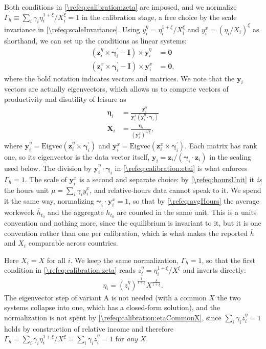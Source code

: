 Both conditions in \eqref{\refeq:calibration:zeta} are imposed, and we normalize $\Gamma_h \equiv \sum_i \gamma_i\eta_i^{1+\xi}/X_i^{\xi} = 1$ in the calibration stage, a free choice by the scale invariance in \eqref{\refeq:scaleInvariance}. Using $y_i^{\eta} = \eta_i^{1+\xi}/X_i^{\xi}$ and $y_i^x = (\eta_i/X_i)^{\xi}$ as shorthand, we can set up the conditions as linear systems:
\begin{align*}
    \left(\bm{z}_i^{\eta} \times \bm{\gamma}_i^{\prime}-\bm{I}\right)\times \bm{y}_i^{\eta} &= \bm{0} \\
    \left(\bm{z}_i^{x} \times \bm{\gamma}_i^{\prime}-\bm{I}\right)\times \bm{y}_i^{x} &= \bm{0},
\end{align*}
where the bold notation indicates vectors and matrices. We note that the $\bm{y}_i$ vectors are actually eigenvectors, which allows us to compute vectors of productivity and disutility of leisure as
\begin{align}
    \bm{\eta}_i &= \frac{\bm{y}^{\eta}_i}{\bm{y}_i^x \left(\bm{y}_i^{\eta} \cdot \bm{\gamma}_i\right)} \label{\refeq:calibration:etai} \\
    \bm{X}_i &= \frac{\bm{\eta}_i}{(\bm{y}_i^x)^{1/\xi}}, \label{\refeq:calibration:Xi}
\end{align}
where $\bm{y}_i^{\eta} = \text{Eigvec}(\bm{z}_i^{\eta}\times \bm{\gamma}_i^{\prime})$ and $\bm{y}_i^{x} = \text{Eigvec}(\bm{z}_i^{x}\times \bm{\gamma}_i^{\prime})$. Each matrix has rank one, so its eigenvector is the data vector itself, $\bm{y}_i = \bm{z}_i/(\bm{\gamma}_i\cdot\bm{z}_i)$ in the scaling used below. The division by $\bm{y}_i^{\eta}\cdot\bm{\gamma}_i$ in \eqref{\refeq:calibration:etai} is what enforces $\Gamma_h = 1$. The scale of $\bm{y}^x_i$ is a second and separate choice: by \eqref{\refeq:hoursUnit} it \emph{is} the hours unit $\mu = \sum_i\gamma_iy_i^x$, and relative-hours data cannot speak to it. We spend it the same way, normalizing $\bm{\gamma}_i\cdot\bm{y}^x_i = 1$, so that by \eqref{\refeq:avgHours} the average workweek $\overline{h}_{t_0}$ and the aggregate $h_{t_0}$ are counted in the same unit. This is a units convention and nothing more, since the equilibrium is invariant to it, but it is one convention rather than one per calibration, which is what makes the reported $\overline{h}$ and $X_i$ comparable across countries.

Here $X_i = X$ for all $i$. We keep the same normalization, $\Gamma_h = 1$, so that the first condition in \eqref{\refeq:calibration:zeta} reads $z_i^{\eta} = \eta_i^{1+\xi}/X^{\xi}$ and inverts directly:
\begin{align}\label{\refeq:calibration:etaCommonX}
    \eta_i = \left(z_i^{\eta}\right)^{\frac{1}{1+\xi}}X^{\frac{\xi}{1+\xi}}.
\end{align}
The eigenvector step of variant A is not needed (with a common $X$ the two systems collapse into one, which has a closed-form solution), and the normalization is not spent by \eqref{\refeq:calibration:etaCommonX}, since $\sum_i\gamma_iz_i^{\eta} = 1$ holds by construction of relative income and therefore $\Gamma_h = \sum_i\gamma_i\eta_i^{1+\xi}/X^{\xi} = \sum_i\gamma_iz_i^{\eta} = 1$ for \emph{any} $X$.

